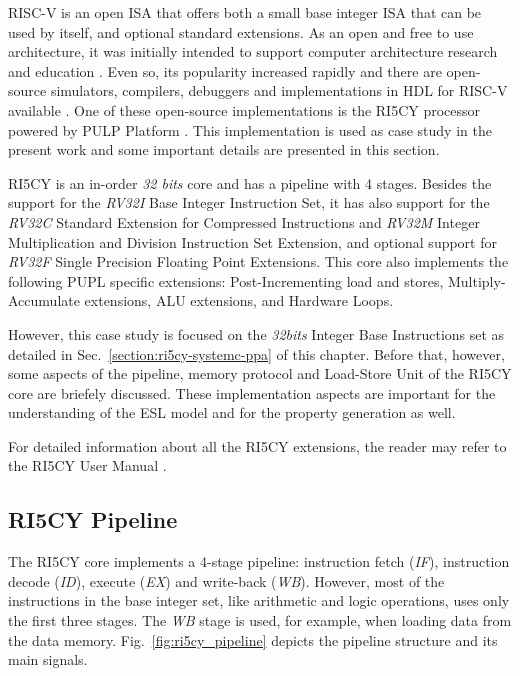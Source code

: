 RISC-V is an open ISA that offers both a small base integer ISA that can be used by itself, and optional standard extensions. As an open and free to use architecture, it was initially intended to support computer architecture research and education \cite{spec-riscv}. Even so, its popularity increased rapidly and there are open-source simulators, compilers, debuggers and implementations in HDL for RISC-V available \cite{book-comp-org}. One of these open-source implementations is the RI5CY processor powered by PULP Platform \cite{pulp}. This implementation is used as case study in the present work and some important details are presented in this section. 

RI5CY is an in-order \textit{32 bits} core and has a pipeline with 4 stages. Besides the support for the \textit{RV32I} Base Integer Instruction Set, it has also support for the \textit{RV32C} Standard Extension for Compressed Instructions and \textit{RV32M} Integer Multiplication and Division Instruction Set Extension, and optional support for \textit{RV32F} Single Precision Floating Point Extensions. This core also implements the following PUPL specific extensions:  Post-Incrementing load and stores, Multiply-Accumulate extensions, ALU extensions, and Hardware Loops.

However, this case study is focused on the \textit{32bits} Integer Base Instructions set as detailed in Sec.~\ref{section:ri5cy-systemc-ppa} of this chapter. Before that, however, some aspects of the pipeline, memory protocol and Load-Store Unit of the RI5CY core are briefely discussed. These implementation aspects are important for the understanding of the ESL model and for the property generation as well.

For detailed information about all the RI5CY extensions, the reader may refer to the RI5CY User Manual \cite{manual-ri5cy}.

\subsection*{RI5CY Pipeline}

The RI5CY core implements a 4-stage pipeline: instruction fetch (\textit{IF}), instruction decode (\textit{ID}), execute (\textit{EX}) and write-back (\textit{WB}). However, most of the instructions in the base integer set, like arithmetic and logic operations, uses only the first three stages. The \textit{WB} stage is used, for example, when loading data from the data memory. Fig.~\ref{fig:ri5cy_pipeline} depicts the pipeline structure and its main signals.

